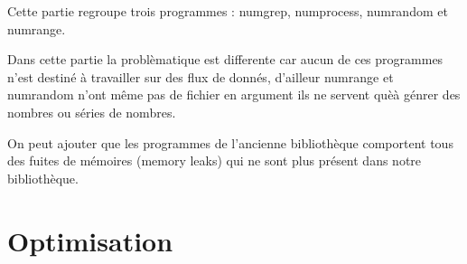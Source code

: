 Cette partie regroupe trois programmes : numgrep, numprocess, numrandom et numrange.
\newline

Dans cette partie la problèmatique est differente car aucun de ces programmes n'est destiné à travailler sur des flux de donnés, d'ailleur numrange et numrandom n'ont même pas de fichier en argument ils ne servent quèà génrer des nombres ou séries de nombres.


On peut ajouter que les programmes de l'ancienne bibliothèque comportent tous des fuites de mémoires (memory leaks) qui ne sont plus présent dans notre bibliothèque.

\section{Optimisation}